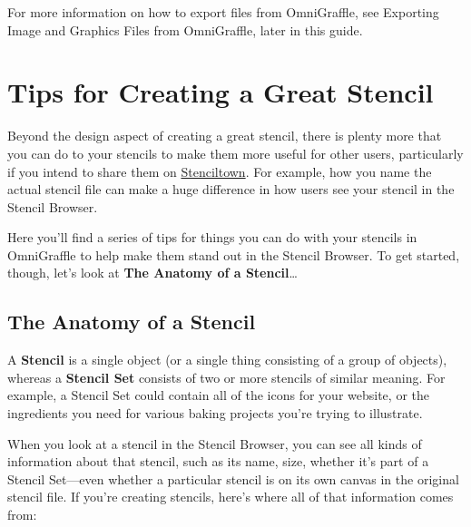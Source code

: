 \documentclass[../main.tex]{subfiles}
\begin{document}

For more information on how to export files from OmniGraffle, see Exporting Image and Graphics
Files from OmniGraffle, later in this guide.

\section{Tips for Creating a Great Stencil}

Beyond the design aspect of creating a great stencil, there is plenty more that you can do to
your stencils to make them more useful for other users, particularly if you intend to share
them on \href{https://stenciltown.omnigroup.com}{Stenciltown}. For example, how you name the
actual stencil file can make a huge difference in how users see your stencil in the Stencil
Browser.

Here you'll find a series of tips for things you can do with your stencils in OmniGraffle to
help make them stand out in the Stencil Browser. To get started, though, let's look at
\textbf{The Anatomy of a Stencil}\ldots{}

\subsection{The Anatomy of a Stencil}

A \textbf{Stencil} is a single object (or a single thing consisting of a group of objects),
whereas a \textbf{Stencil Set} consists of two or more stencils of similar meaning. For
example, a Stencil Set could contain all of the icons for your website, or the ingredients you
need for various baking projects you're trying to illustrate.

When you look at a stencil in the Stencil Browser, you can see all kinds of information about
that stencil, such as its name, size, whether it's part of a Stencil Set---even whether a
particular stencil is on its own canvas in the original stencil file. If you're creating
stencils, here's where all of that information comes from:

\end{document}
